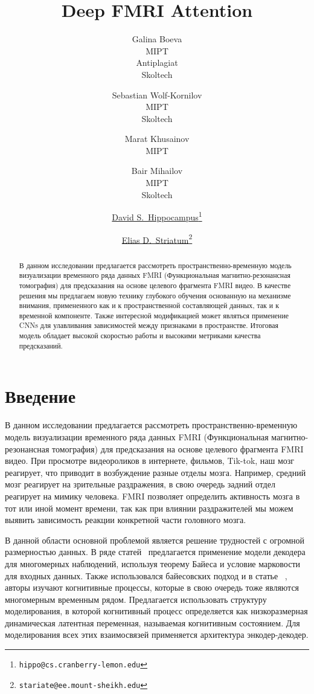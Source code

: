 \documentclass{article}
\title{Deep FMRI Attention }
\author{Galina Boeva \\
	MIPT\\
	Antiplagiat\\
	  Skoltech \\
 \and Sebastian Wolf-Kornilov \\
 MIPT \\
 Skoltech
 \and Marat Khusainov \\
 MIPT 
 \and Bair Mihailov \\
 MIPT\\
 Skoltech
}
\author[1]{%
	\href{https://orcid.org/0000-0000-0000-0000}{\usebox{\orcid}\hspace{1mm}David S.~Hippocampus\thanks{\texttt{hippo@cs.cranberry-lemon.edu}}}%
}
\author[1,2]{%
	\href{https://orcid.org/0000-0000-0000-0000}{\usebox{\orcid}\hspace{1mm}Elias D.~Striatum\thanks{\texttt{stariate@ee.mount-sheikh.edu}}}%
}
\affil[1]{}
\affil[2]{}
\begin{document}
\maketitle

\begin{abstract}
В данном исследовании предлагается рассмотреть пространственно-временную модель визуализации временного ряда данных FMRI (Функциональная магнитно-резонансная томография) для предсказания на основе целевого фрагмента FMRI видео. В качестве решения мы предлагаем новую технику глубокого обучения основанную на механизме внимания, примененного как и к пространственной составляющей данных, так и к временной компоненте. Также интересной модификацией может являться применение CNNs для улавливания зависимостей между признаками в пространстве. Итоговая модель обладает высокой скоростью  работы и высокими метриками качества предсказаний.      
\end{abstract}




\section{Введение}

В данном исследовании предлагается рассмотреть пространственно-временную модель визуализации временного ряда данных FMRI (Функциональная магнитно-резонансная томография) для предсказания на основе целевого фрагмента FMRI видео. При просмотре видеороликов в интернете, фильмов, Tik-tok, наш мозг реагирует, что приводит в возбуждение разные отделы мозга. Например, средний мозг реагирует на зрительные раздражения, в свою очередь задний отдел реагирует на мимику человека. FMRI позволяет определить активность мозга в тот или иной момент времени, так как при влиянии раздражителей мы можем выявить зависимость реакции конкретной части головного мозга.

В данной области основной проблемой является решение трудностей с огромной размерностью данных. В ряде статей~\cite{ rezaei2023deep, rezaei2020bayesian} предлагается применение модели декодера для  многомерных наблюдений, используя теорему Байеса и условие марковости для входных данных. Также использовался байесовских подход и в статье ~\cite{yousefi2019decoding}, авторы изучают когнитивные процессы, которые в свою очередь тоже являются многомерным временным рядом. Предлагается использовать структуру моделирования, в которой когнитивный процесс определяется как низкоразмерная динамическая латентная переменная, называемая когнитивным состоянием. Для моделирования всех этих взаимосвязей применяется архитектура энкодер-декодер. 
\end{document}
